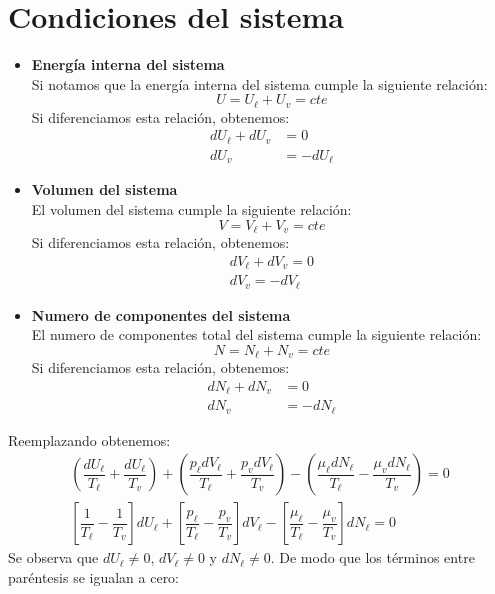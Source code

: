 \documentclass[../main]{subfiles}
\begin{document}
\section{Condiciones del sistema}
\begin{itemize}
    \item \textbf{Energía interna del sistema} \\[0.3cm]
    Si notamos que la energía interna del sistema cumple la siguiente relación:
    \begin{equation}
        U=U_{\ell}+U_v=cte
    \end{equation}
    Si diferenciamos esta relación, obtenemos:
    \begin{align}
        dU_{\ell}+dU_v&=0 \\
        dU_v&=-dU_{\ell}
    \end{align}
    \item \textbf{Volumen del sistema}\\[0.3cm]
    El volumen del sistema cumple la siguiente relación:
    \begin{equation}
        V=V_{\ell}+V_v=cte
    \end{equation}
    Si diferenciamos esta relación, obtenemos:
    \begin{align}
        dV_{\ell}+dV_v=0 \\
        dV_v=-dV_{\ell}
    \end{align}
    \item \textbf{Numero de componentes del sistema} \\[0.3cm]
    El numero de componentes total del sistema cumple la siguiente relación:
    \begin{equation}
        N=N_{\ell}+N_v=cte
    \end{equation}
    Si diferenciamos esta relación, obtenemos:
    \begin{align}
        dN_{\ell}+dN_v&=0 \\
        dN_v&=-dN_{\ell}
    \end{align}
\end{itemize}
Reemplazando obtenemos:
\begin{align}
    \left( \dfrac{dU_{\ell}}{T_{\ell}}+ \dfrac{dU_{\ell}}{T_v} \right)+\left( \dfrac{p_{\ell}dV_{\ell}}{T_{\ell}}+\dfrac{p_v dV_{\ell}}{T_v} \right)-\left( \dfrac{\mu_{\ell} dN_{\ell}}{T_{\ell}}-\dfrac{\mu_v dN_{\ell}}{T_v} \right)=0 \\
    \left[ \dfrac{1}{T_{\ell}}-\dfrac{1}{T_v} \right]dU_{\ell}+\left[ \dfrac{p_{\ell}}{T_{\ell}}-\dfrac{p_v}{T_v} \right]dV_{\ell}-\left[ \dfrac{\mu_{\ell}}{T_{\ell}}-\dfrac{\mu_v}{T_v} \right]dN_{\ell}=0
\end{align}
Se observa que $dU_{\ell} \neq 0$, $dV_{\ell} \neq 0$ y $dN_{\ell} \neq 0$. De modo que los términos entre paréntesis se igualan a cero:
\end{document}
